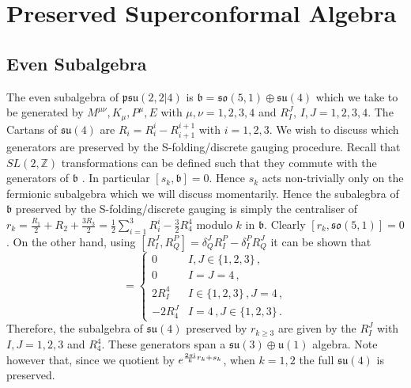 \documentclass[main.tex]{subfiles}
\begin{document}
\section{Preserved Superconformal Algebra}\label{sec:preservedSCA}
\subsection{Even Subalgebra}
The even subalgebra of $\mathfrak{psu}(2,2|4)$ is $\mathfrak{b}=\mathfrak{so}(5,1)\oplus\mathfrak{su}(4)$ which we take to be generated by $M^{\mu\nu},K_{\mu},P^{\mu},E$ with $\mu,\nu=1,2,3,4$ and $R_I^J$, $I,J=1,2,3,4$. The Cartans of $\mathfrak{su}(4)$ are $R_i=R_i^i-R^{i+1}_{i+1}$ with $i=1,2,3$. We wish to discuss which generators are preserved by the S-folding/discrete gauging procedure.
Recall that $SL(2,\mathbb{Z})$ transformations can be defined such that they commute with the generators of $\mathfrak{b}$ \cite{Kapustin:2006pk}. In particular $[s_k,\mathfrak{b}]=0$. Hence $s_k$ acts non-trivially only on the fermionic subalgebra which we will discuss momentarily. Hence the subalegbra of $\mathfrak{b}$ preserved by the S-folding/discrete gauging is simply the centraliser of $r_k=\frac{R_1}{2}+R_2+\frac{3R_3}{2}=\frac{1}{2}\sum_{i=1}^3R_i^i-\frac{3}{2}R_4^4$ modulo $k$ in $\mathfrak{b}$. Clearly $\left[r_k,\mathfrak{so}(5,1)\right]=0$. On the other hand, using $\left[R_I^J,R^P_Q\right]=\delta_Q^JR_I^P-\delta^P_IR_Q^J$ it can be shown that
\begin{equation}
[r_k,R^J_I]=\begin{cases}
0&I,J\in\{1,2,3\}\,,\\
0&I=J=4\,,\\
2R^4_I&I\in\{1,2,3\}\,,J=4\,,\\
-2R_4^J&I=4\,,J\in\{1,2,3\}\,.
\end{cases}
\end{equation}
Therefore, the subalgebra of $\mathfrak{su}(4)$ preserved by $r_{k\geq3}$ are given by the $R_I^J$ with $I,J=1,2,3$ and $R_4^4$. These generators span a $\mathfrak{su}(3)\oplus\mathfrak{u}(1)$ algebra. Note however that, since we quotient by $e^{\frac{2\pi\mathrm{i}}{k}r_k+ s_k}$, when $k=1,2$ the full $\mathfrak{su}(4)$ is preserved.
\end{document}
